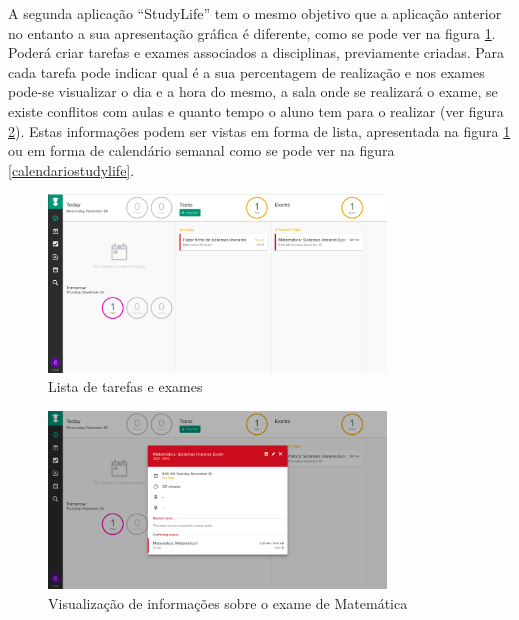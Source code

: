 \documentclass[11pt, twoside]{report}
\begin{document}
	A segunda aplicação ``StudyLife'' tem o mesmo objetivo que a aplicação anterior no entanto a sua apresentação gráfica é diferente, como se pode ver na figura \ref{listastudylife}. Poderá criar tarefas e exames associados a disciplinas, previamente criadas. Para cada tarefa pode indicar qual é a sua percentagem de realização e nos exames pode-se visualizar o dia e a hora do mesmo, a sala onde se realizará o exame, se existe conflitos com aulas e quanto tempo o aluno tem para o realizar (ver figura \ref{examematematica}). Estas informações podem ser vistas em forma de lista, apresentada na figura \ref{listastudylife} ou em forma de calendário semanal como se pode ver na figura \ref{calendariostudylife}.	
	
\begin{figure}[H] 
	\centering 
	\includegraphics[width=0.8\textwidth,height=0.8\textheight,keepaspectratio]{image/estadodearte/calendario}
	\caption{Lista de tarefas e exames}
	\label{listastudylife}
\end{figure}

\begin{figure}[H] 
	\centering 
	\includegraphics[width=0.8\textwidth,height=0.8\textheight,keepaspectratio]{image/estadodearte/informacoesexame}
	\caption{Visualização de informações sobre o exame de Matemática}
	\label{examematematica}
\end{figure}
\end{document}
